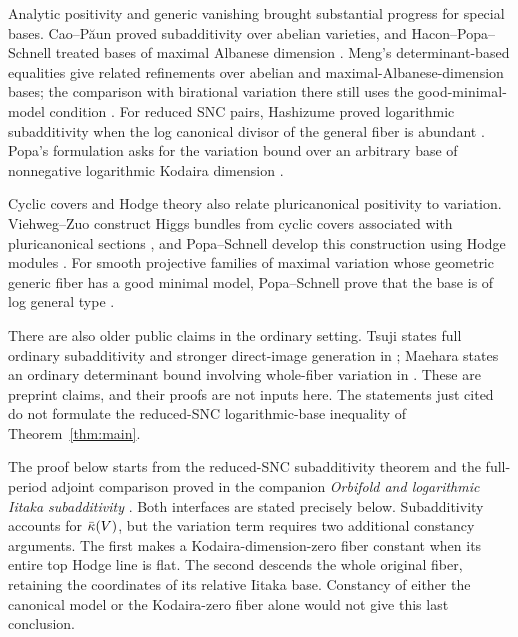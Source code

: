 Analytic positivity and generic vanishing brought substantial progress
for special bases. Cao--P\u aun proved subadditivity over abelian
varieties, and Hacon--Popa--Schnell treated bases of maximal Albanese
dimension \cite{CaoPaunAbelian,HaconPopaSchnellAbelian}.
Meng's determinant-based equalities give related refinements over
abelian and maximal-Albanese-dimension bases; the comparison with
birational variation there still uses the good-minimal-model condition
\cite[Theorems~1.9--1.10 and the preceding discussion]{MengSurjective}.
For reduced SNC pairs, Hashizume proved logarithmic subadditivity when
the log canonical divisor of the general fiber is abundant
\cite[Theorem~1.2]{Hashizume}. Popa's formulation asks for the variation
bound over an arbitrary base of nonnegative logarithmic Kodaira dimension
\cite[Conjecture~3.8]{PopaConjectures}.

Cyclic covers and Hodge theory also relate pluricanonical positivity
to variation. Viehweg--Zuo construct Higgs bundles from cyclic covers
associated with pluricanonical sections \cite[\S4]{ViehwegZuo02},
and Popa--Schnell develop this construction using Hodge modules
\cite[\S\S9--11]{PopaSchnellHyperbolicity}. For smooth projective families of
maximal variation whose geometric generic fiber has a good minimal
model, Popa--Schnell prove that the base is of log general type
\cite[Theorem~A]{PopaSchnellHyperbolicity}.

There are also older public claims in the ordinary setting. Tsuji
states full ordinary subadditivity and stronger direct-image generation
in \cite[Theorems~1.9 and~1.13]{TsujiDirectImages}; Maehara states an
ordinary determinant bound involving whole-fiber variation in
\cite[\S7, Theorem~8]{MaeharaIitaka}. These are preprint claims, and their
proofs are not inputs here. The statements just cited do not formulate
the reduced-SNC logarithmic-base inequality of Theorem~\ref{thm:main}.

The proof below starts from the reduced-SNC subadditivity theorem and
the full-period adjoint comparison proved in the companion
\emph{Orbifold and logarithmic Iitaka subadditivity}
\cite{SubadditivityCompanion}. Both interfaces are stated precisely
below. Subadditivity accounts for $\bar\kappa(V)$, but the variation term
requires two additional constancy arguments. The first makes a
Kodaira-dimension-zero fiber constant when its entire top Hodge line
is flat. The second descends the whole original fiber, retaining the
coordinates of its relative Iitaka base. Constancy of either the
canonical model or the Kodaira-zero fiber alone would not give this
last conclusion.


